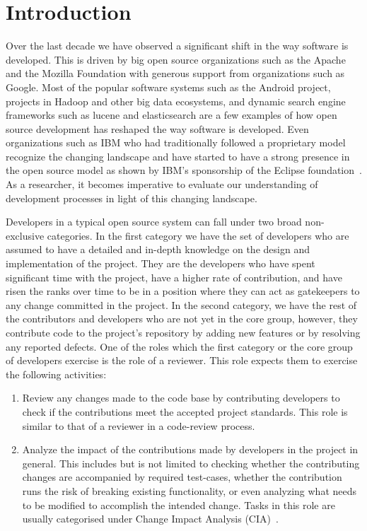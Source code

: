 
\section{Introduction}
\label{sec:intro}

Over the last decade we have observed a significant shift in the way software is developed. This is driven by big open source organizations such as the Apache and the Mozilla Foundation with generous support from organizations such as Google. Most of the popular software systems such as the Android project, projects in Hadoop and other big data ecosystems, and dynamic search engine frameworks such as lucene and elasticsearch are a few examples of how open source development has reshaped the way software is developed. Even organizations such as IBM who had traditionally followed a proprietary model recognize the changing landscape and have started to have a strong presence in the open source model as shown by IBM's sponsorship of the Eclipse foundation~\cite{Eclipse}. As a researcher, it becomes imperative to evaluate our understanding of development processes in light of this changing landscape.

Developers in a typical open source system can fall under two broad non-exclusive categories. In the first category we have the set of developers who are assumed to have a detailed and in-depth knowledge on the design and implementation of the project. They are the developers who have spent significant time with the project, have a higher rate of contribution, and have risen the ranks over time to be in a position where they can act as gatekeepers to any change committed in the project. In the second category, we have the rest of the contributors and developers who are not yet in the core group, however, they contribute code to the project's repository by adding new features or by resolving any reported defects. One of the roles which the first category or the core group of developers exercise is the role of a reviewer. This role expects them to exercise the following activities:\\
\begin{enumerate}
\item Review any changes made to the code base by contributing developers to check if the contributions meet the accepted project standards. This role is similar to that of a reviewer in a code-review process.
\item Analyze the impact of the contributions made by developers in the project in general. This includes but is not limited to checking whether the contributing changes are accompanied by required test-cases, whether the contribution runs the risk of breaking existing functionality, or even analyzing what needs to be modified to accomplish the intended change. Tasks in this role are usually categorised under Change Impact Analysis (CIA)~\cite{STVSTVR1475}.
\end{enumerate}

